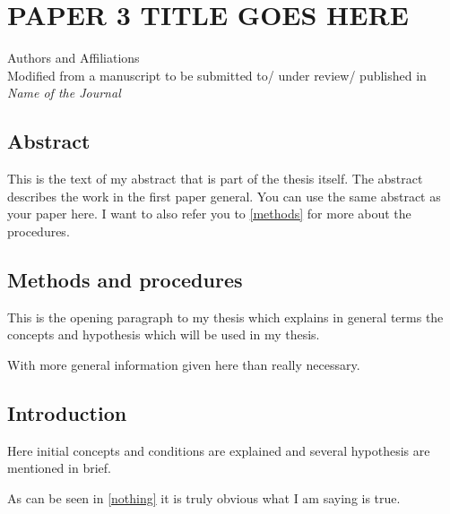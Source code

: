 \chapter{\MakeUppercase{Paper 3 Title Goes Here}}

\begin{center}
    Authors and Affiliations \\
    Modified from a manuscript to be submitted to/ under review/ published in \textit{Name of the Journal}
\end{center}

\section{Abstract}
This is the text of my abstract that is part of the thesis itself.
The abstract describes the work in the first paper general. You can use the same abstract as your paper here.
I want to also refer you to \autoref{methods} for more about the procedures.


\section{Methods and procedures}
\label{methods}

This is the opening paragraph to my thesis which
explains in general terms the concepts and hypothesis
which will be used in my thesis.

With more general information given here than really
necessary.

\section{Introduction}

Here initial concepts and conditions are explained and
several hypothesis are mentioned in brief.

As can be seen in \autoref{nothing} it is truly
obvious what I am saying is true.

